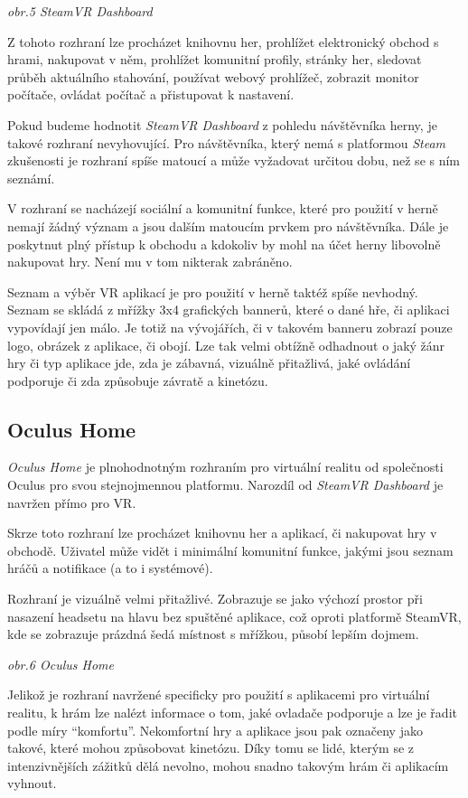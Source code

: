 \emph{obr.5 SteamVR Dashboard}

Z tohoto rozhraní lze procházet knihovnu her, prohlížet elektronický
obchod s hrami, nakupovat v něm, prohlížet komunitní profily, stránky
her, sledovat průběh aktuálního stahování, používat webový prohlížeč,
zobrazit monitor počítače, ovládat počítač a přistupovat k nastavení.

Pokud budeme hodnotit \emph{SteamVR Dashboard} z pohledu návštěvníka
herny, je takové rozhraní nevyhovující. Pro návštěvníka, který nemá s
platformou \emph{Steam} zkušenosti je rozhraní spíše matoucí a může
vyžadovat určitou dobu, než se s ním seznámí. 

V rozhraní se nacházejí
sociální a komunitní funkce, které pro použití v herně nemají žádný
význam a jsou dalším matoucím prvkem pro návštěvníka. Dále je poskytnut
plný přístup k obchodu a kdokoliv by mohl na účet herny libovolně
nakupovat hry. Není mu v tom nikterak zabráněno.

Seznam a výběr VR aplikací je pro použití v herně taktéž spíše nevhodný.
Seznam se skládá z mřížky 3x4 grafických bannerů, které o dané hře, či aplikaci 
vypovídají jen málo. Je totiž na vývojářích, či v takovém banneru
zobrazí pouze logo, obrázek z aplikace, či obojí. Lze tak velmi obtížně
odhadnout o jaký žánr hry či typ aplikace jde, zda je zábavná, vizuálně přitažlivá, jaké
ovládání podporuje či zda způsobuje závratě a kinetózu.

\subsection{Oculus Home}\label{oculus-home}

\emph{Oculus Home} je plnohodnotným rozhraním pro virtuální realitu od
společnosti Oculus pro svou stejnojmennou platformu. Narozdíl od
\emph{SteamVR Dashboard} je navržen přímo pro VR.

Skrze toto rozhraní lze procházet knihovnu her a aplikací, či nakupovat hry v
obchodě. Uživatel může vidět i minimální komunitní funkce, jakými jsou
seznam hráčů a notifikace (a to i systémové).

Rozhraní je vizuálně velmi přitažlivé. Zobrazuje se jako výchozí prostor
při nasazení headsetu na hlavu bez spuštěné aplikace, což oproti platformě
SteamVR, kde se zobrazuje prázdná šedá místnost s mřížkou, působí lepším
dojmem.


\emph{obr.6 Oculus Home}

Jelikož je rozhraní navržené specificky pro použití s aplikacemi pro
virtuální realitu, k hrám lze nalézt informace o tom, jaké ovladače
podporuje a lze je řadit podle míry ``komfortu''. Nekomfortní hry a aplikace jsou
pak označeny jako takové, které mohou způsobovat kinetózu. Díky tomu se
lidé, kterým se z intenzivnějších zážitků dělá nevolno, mohou snadno takovým
hrám či aplikacím vyhnout.

